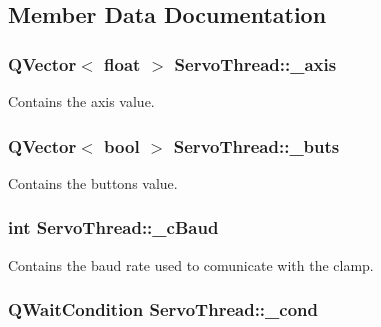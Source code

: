 \subsection{Member Data Documentation}
\hypertarget{class_servo_thread_aad24ef961ee39dd35766c725c13b11b7}{}
\subsubsection[{\+\_\+axis}]{\setlength{\rightskip}{0pt plus 5cm}Q\+Vector$<$ float $>$ Servo\+Thread\+::\+\_\+axis\hspace{0.3cm}{\ttfamily [private]}}\label{class_servo_thread_aad24ef961ee39dd35766c725c13b11b7}


Contains the axis value. 

\hypertarget{class_servo_thread_a6f956f7e0f2953e213ff95fb64857ab0}{}
\subsubsection[{\+\_\+buts}]{\setlength{\rightskip}{0pt plus 5cm}Q\+Vector$<$ bool $>$ Servo\+Thread\+::\+\_\+buts\hspace{0.3cm}{\ttfamily [private]}}\label{class_servo_thread_a6f956f7e0f2953e213ff95fb64857ab0}


Contains the buttons value. 

\hypertarget{class_servo_thread_a9fccfd415e2e55c8abef7fcc6535af30}{}
\subsubsection[{\+\_\+c\+Baud}]{\setlength{\rightskip}{0pt plus 5cm}int Servo\+Thread\+::\+\_\+c\+Baud\hspace{0.3cm}{\ttfamily [private]}}\label{class_servo_thread_a9fccfd415e2e55c8abef7fcc6535af30}


Contains the baud rate used to comunicate with the clamp. 

\hypertarget{class_servo_thread_afcb93c09acd7fecf47d92996a297365c}{}
\subsubsection[{\+\_\+cond}]{\setlength{\rightskip}{0pt plus 5cm}Q\+Wait\+Condition Servo\+Thread\+::\+\_\+cond\hspace{0.3cm}{\ttfamily [private]}}\label{class_servo_thread_afcb93c09acd7fecf47d92996a297365c}


